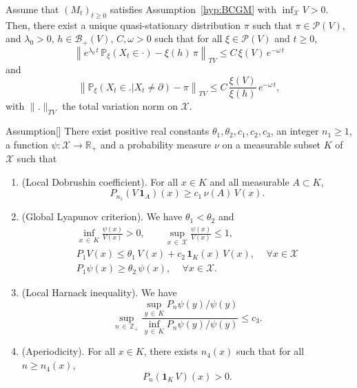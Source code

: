 \documentclass[AHL,Unicode,longabstracts,published]{cedram}
\newcommand{\PP}{\mathbb{P}}
\newcommand{\RR}{\mathbb{R}}
\newcommand{\ZZ}{\mathbb{Z}}
\newcommand{\clX}{\mathcal{X}}
\newcommand{\clB}{\mathcal{B}}
\newcommand{\clP}{\mathcal{P}}
\newcommand{\1}{\mathbf{1}}
\newcommand*{\Genumi}{\renewcommand*{\theenumi}{G\arabic{enumi}}}
\let\oldforall\forall
\renewcommand*{\forall}{\mathrel{\oldforall}}
\begin{document}
\begin{theo}\label{th:BCGM}
Assume that $(M_t)_{t\geq 0}$ satisfies Assumption~\ref{hyp:BCGM} with $\inf_\clX V>0$. Then, there exist a unique quasi-stationary distribution $\pi$ such that $\pi\in\clP(V)$, and $\lambda_0>0$, $h\in\clB_+(V)$, $C,\omega>0$ such that for all $\xi\in\clP(V)$ and $t\geq 0$,
\[
\left\lVert e^{\lambda_0 \,t}\,\PP_\xi(X_t\in \cdot)-\xi(h)\,\pi\right\rVert_{TV}\leq C\,\xi(V)\,e^{-\omega\,t}
\]
and
\[
\left\lVert\PP_\xi(X_t\in. | X_t\neq \partial)-\pi\right\rVert_{TV}\leq C\,\frac{\xi(V)}{\xi(h)}\,e^{-\omega\,t},
\]
with $\lVert.\rVert_{TV}$ the total variation norm on $\clX$.
\end{theo}



\begin{enonce}{Assumption}[{\cite[Condition~(G) (including Remark~2.2)]{CV20}}]\label{hyp:CV20}
There exist positive real constants $\theta_1, \theta_2, c_1, c_2, c_3$, an integer $n_1\geq 1$, a function $\psi:\clX \to \RR_+$ and a probability measure $\nu$ on a measurable subset $K$ of $\clX$ such that
\begin{enumerate}\Genumi
\item\label{AssumpG1} (Local Dobrushin coefficient). For all $x \in K$ and all measurable $A\subset K$,
\[
P_{n_1}(V\,\1_A)(x)\geq c_1\,\nu(A)\,V(x).
\]
\item\label{AssumpG2} (Global Lyapunov criterion). We have $\theta_1<\theta_2$ and
\begin{gather*}
\inf_{x\,\in\,K} \frac{\psi(x)}{V(x)}>0, \qquad \sup_{x\,\in\,\clX} \frac{\psi(x)}{V(x)}\leq 1,
\\
P_1 V(x) \leq \theta_1 \, V(x) + c_2\,\1_K(x)\,V(x),\, \quad \forall x\in \clX
\\
P_1 \psi(x) \geq \theta_2 \, \psi(x),\, \quad \forall x\in \clX.
\end{gather*}
\item\label{AssumpG3} (Local Harnack inequality). We have
\[
\sup_{n\,\in\,\ZZ_+}\frac{\sup_{y\,\in\,K}P_n \psi(y)/\psi(y)}{\inf_{y\,\in\,K}P_n \psi(y)/\psi(y)} \leq c_3.
\]

\item\label{AssumpG4} (Aperiodicity). For all $x\in K$, there exists $n_4(x)$ such that for all $n\geq n_4(x)$,
\[
P_n(\1_K\,V)(x)>0.
\]
\end{enumerate}
\end{enonce}
\end{document}
